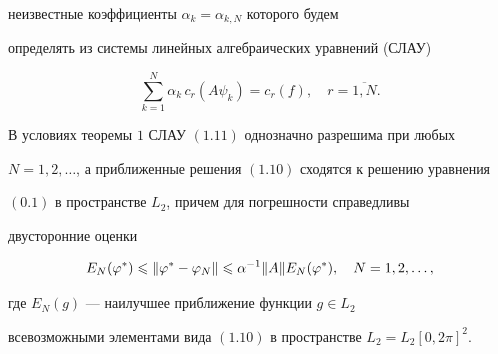 неизвестные коэффициенты $\alpha _k=\alpha _{k,N}$ которого будем


определять из системы линейных алгебраических уравнений (СЛАУ)


\begin{equation}


\sum_{k=1}^N\alpha _k\, c_r(A\psi_k)=c_r(f),\quad r=\overline{1,N}.


\end{equation}








\begin{thm} 


В условиях теоремы $1$ СЛАУ $(1.11)$ однозначно разрешима при любых


$N=1,2,\dotsc$, а приближенные решения $(1.10)$ сходятся к решению уравнения


$(0.1)$ в пространстве $L_2$, причем для погрешности справедливы


двусторонние оценки


\begin{equation}


E_N (\varphi^*)\lea \|\varphi^* -\varphi _N\|\lea


\alpha ^{-1}\|A\|E_N (\varphi^*),\quad N=1,2,\dotsc,


\end{equation}


где $E_N(g)$ --- наилучшее приближение функции $g\in L_2$


всевозможными элементами вида $(1.10)$ в пространстве $L_2=L_2[0,2\pi]^2$.


\end{thm}






